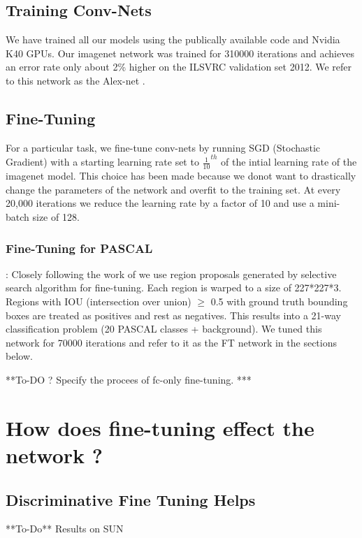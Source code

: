 \documentclass[runningheads]{llncs}
\begin{document}
\subsection{Training Conv-Nets}
\label{sub:train}
We have trained all our models using the publically available code \cite{caffe} and Nvidia K40 GPUs. Our imagenet network was trained for 310000 iterations and achieves an error rate only about 2\% higher on the ILSVRC validation set 2012. We refer to this network as the Alex-net .

\subsection{Fine-Tuning}
\label{sub:fine-train}
For a particular task, we fine-tune conv-nets by running SGD (Stochastic Gradient) with a starting learning rate set to $\frac{1}{10}^{th}$ of the intial learning rate of the imagenet model. This choice has been made because we donot want to drastically change the parameters of the network and overfit to the training set. At every 20,000 iterations we reduce the learning rate by a factor of 10 and use a mini-batch size of 128.

\subsubsection{Fine-Tuning for PASCAL}: Closely following the work of \cite{rcnn} we use region proposals generated by selective search algorithm for fine-tuning. Each region is warped to a size of 227*227*3. Regions with IOU (intersection over union) $\geq$ 0.5 with ground truth bounding boxes are treated as positives and rest as negatives. This  results into a 21-way classification problem (20 PASCAL classes + background). We tuned this network for 70000 iterations and refer to it as the FT network in the sections below.

**To-DO ? Specify the procees of fc-only fine-tuning.  ***

\section{How does fine-tuning effect the network ?}



\subsection{Discriminative Fine Tuning Helps}
**To-Do** Results on SUN
\end{document}
